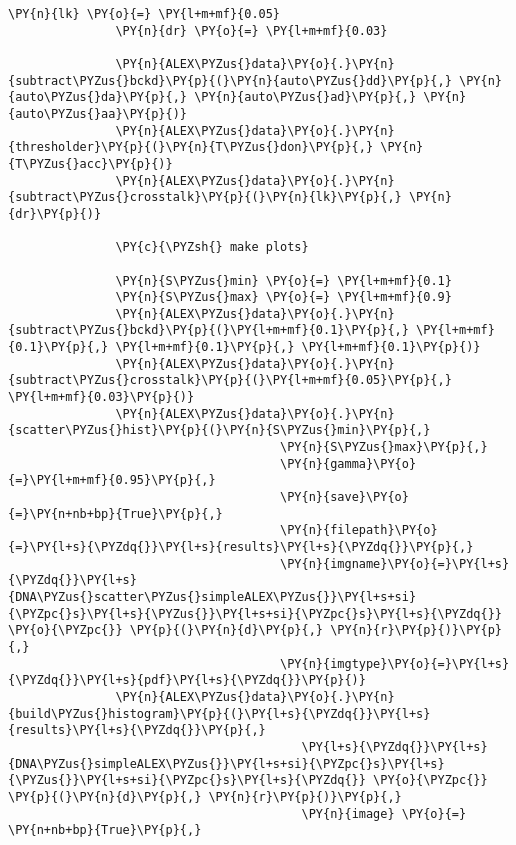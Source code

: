 \begin{Verbatim}[commandchars=\\\{\}, fontsize=\scriptsize]
               \PY{n}{lk} \PY{o}{=} \PY{l+m+mf}{0.05}
               \PY{n}{dr} \PY{o}{=} \PY{l+m+mf}{0.03}
               
               \PY{n}{ALEX\PYZus{}data}\PY{o}{.}\PY{n}{subtract\PYZus{}bckd}\PY{p}{(}\PY{n}{auto\PYZus{}dd}\PY{p}{,} \PY{n}{auto\PYZus{}da}\PY{p}{,} \PY{n}{auto\PYZus{}ad}\PY{p}{,} \PY{n}{auto\PYZus{}aa}\PY{p}{)}
               \PY{n}{ALEX\PYZus{}data}\PY{o}{.}\PY{n}{thresholder}\PY{p}{(}\PY{n}{T\PYZus{}don}\PY{p}{,} \PY{n}{T\PYZus{}acc}\PY{p}{)}
               \PY{n}{ALEX\PYZus{}data}\PY{o}{.}\PY{n}{subtract\PYZus{}crosstalk}\PY{p}{(}\PY{n}{lk}\PY{p}{,} \PY{n}{dr}\PY{p}{)}
       
               \PY{c}{\PYZsh{} make plots}
       
               \PY{n}{S\PYZus{}min} \PY{o}{=} \PY{l+m+mf}{0.1}
               \PY{n}{S\PYZus{}max} \PY{o}{=} \PY{l+m+mf}{0.9}
               \PY{n}{ALEX\PYZus{}data}\PY{o}{.}\PY{n}{subtract\PYZus{}bckd}\PY{p}{(}\PY{l+m+mf}{0.1}\PY{p}{,} \PY{l+m+mf}{0.1}\PY{p}{,} \PY{l+m+mf}{0.1}\PY{p}{,} \PY{l+m+mf}{0.1}\PY{p}{)}
               \PY{n}{ALEX\PYZus{}data}\PY{o}{.}\PY{n}{subtract\PYZus{}crosstalk}\PY{p}{(}\PY{l+m+mf}{0.05}\PY{p}{,} \PY{l+m+mf}{0.03}\PY{p}{)}
               \PY{n}{ALEX\PYZus{}data}\PY{o}{.}\PY{n}{scatter\PYZus{}hist}\PY{p}{(}\PY{n}{S\PYZus{}min}\PY{p}{,} 
                                      \PY{n}{S\PYZus{}max}\PY{p}{,} 
                                      \PY{n}{gamma}\PY{o}{=}\PY{l+m+mf}{0.95}\PY{p}{,} 
                                      \PY{n}{save}\PY{o}{=}\PY{n+nb+bp}{True}\PY{p}{,} 
                                      \PY{n}{filepath}\PY{o}{=}\PY{l+s}{\PYZdq{}}\PY{l+s}{results}\PY{l+s}{\PYZdq{}}\PY{p}{,} 
                                      \PY{n}{imgname}\PY{o}{=}\PY{l+s}{\PYZdq{}}\PY{l+s}{DNA\PYZus{}scatter\PYZus{}simpleALEX\PYZus{}}\PY{l+s+si}{\PYZpc{}s}\PY{l+s}{\PYZus{}}\PY{l+s+si}{\PYZpc{}s}\PY{l+s}{\PYZdq{}} \PY{o}{\PYZpc{}} \PY{p}{(}\PY{n}{d}\PY{p}{,} \PY{n}{r}\PY{p}{)}\PY{p}{,} 
                                      \PY{n}{imgtype}\PY{o}{=}\PY{l+s}{\PYZdq{}}\PY{l+s}{pdf}\PY{l+s}{\PYZdq{}}\PY{p}{)}
               \PY{n}{ALEX\PYZus{}data}\PY{o}{.}\PY{n}{build\PYZus{}histogram}\PY{p}{(}\PY{l+s}{\PYZdq{}}\PY{l+s}{results}\PY{l+s}{\PYZdq{}}\PY{p}{,} 
                                         \PY{l+s}{\PYZdq{}}\PY{l+s}{DNA\PYZus{}simpleALEX\PYZus{}}\PY{l+s+si}{\PYZpc{}s}\PY{l+s}{\PYZus{}}\PY{l+s+si}{\PYZpc{}s}\PY{l+s}{\PYZdq{}} \PY{o}{\PYZpc{}} \PY{p}{(}\PY{n}{d}\PY{p}{,} \PY{n}{r}\PY{p}{)}\PY{p}{,} 
                                         \PY{n}{image} \PY{o}{=} \PY{n+nb+bp}{True}\PY{p}{,} 

\end{Verbatim}
